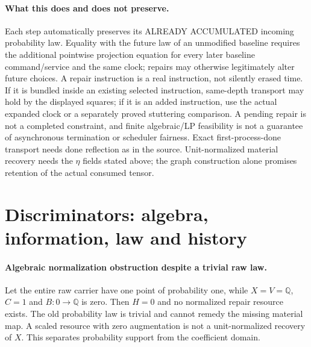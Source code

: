 \documentclass[11pt]{article}
\begin{document}
\paragraph{What this does and does not preserve.}
Each step automatically preserves its ALREADY ACCUMULATED incoming probability law. Equality with the future law of an unmodified baseline requires the additional pointwise projection equation for every later baseline command/service and the same clock; repairs may otherwise legitimately alter future choices. A repair instruction is a real instruction, not silently erased time. If it is bundled inside an existing selected instruction, same-depth transport may hold by the displayed squares; if it is an added instruction, use the actual expanded clock or a separately proved stuttering comparison. A pending repair is not a completed constraint, and finite algebraic/LP feasibility is not a guarantee of asynchronous termination or scheduler fairness. Exact first-process-done transport needs done reflection as in the source. Unit-normalized material recovery needs the $\eta$ fields stated above; the graph construction alone promises retention of the actual consumed tensor.

\section{Discriminators: algebra, information, law and history}
\paragraph{Algebraic normalization obstruction despite a trivial raw law.}
Let the entire raw carrier have one point of probability one, while $X=V=\mathbb Q$, $C=1$ and $B:0\to\mathbb Q$ is zero. Then $H=0$ and no normalized repair resource exists. The old probability law is trivial and cannot remedy the missing material map. A scaled resource with zero augmentation is not a unit-normalized recovery of $X$. This separates probability support from the coefficient domain.
\end{document}
